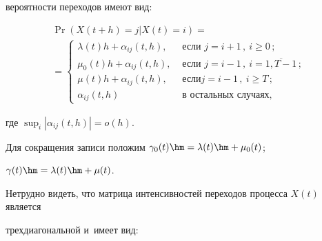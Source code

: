 вероятности переходов имеют вид:

\begin{multline}

\Pr\left(X\left( t+h\right) =j|X\left( t\right) =i\right)

={}\\

{}=\begin{cases}

\lambda\left( t\right)  h+\alpha_{ij}\left(t,

h\right), & \mbox { если }j =  i+1\,,\ i \ge 0\,; \\[1pt]

\mu_{0}\left( t\right)

h+\alpha_{ij}\left(t, h\right), & \mbox { если }j =  i-1\,, \ i =\overline{1,T-1}\,; \\[1pt]

\mu\left( t\right)  h+\alpha_{ij}\left(t, h\right), & \mbox { если

}j = i-1\,, \ i \ge T\,;\\[1pt]

\alpha_{ij}\left(t, h\right) & \mbox { в~остальных случаях,}

\end{cases}

\label{1001}

\end{multline}

\noindent где $\sup_i |\alpha_{ij}(t,h)| = o(h)$.

Для сокращения записи положим $\gamma_0(t)\hm=\lambda(t)\hm+\mu_0(t)$; 

$\gamma(t)\hm=\lambda(t)\hm+\mu(t)$.

Нетрудно видеть, что матрица интенсивностей переходов процесса $X(t)$ является

трехдиагональной и~имеет вид:

